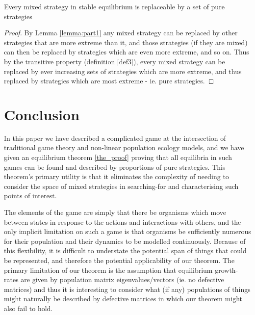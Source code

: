 \begin{Theorem}\label{the_proof}
Every mixed strategy in stable equilibrium is replaceable by a set of pure strategies 
\end{Theorem}
\begin{proof}
By Lemma \ref{lemma:part1} any mixed strategy can be replaced by other strategies that are more extreme than it, and those strategies (if they are mixed) can then be replaced by strategies which are even more extreme, and so on.
Thus by the transitive property (definition \ref{def3}), every mixed strategy can be replaced by ever increasing sets of strategies which are more extreme, and thus replaced by strategies which are most extreme - ie. pure strategies.
\end{proof}

\section{Conclusion}\label{sec:conclusion}

In this paper we have described a complicated game at the intersection of traditional game theory and non-linear population ecology models, and we have given an equilibrium theorem \ref{the_proof} proving that all equilibria in such games can be found and described by proportions of pure strategies. This theorem's primary utility is that it eliminates the complexity of needing to consider the space of mixed strategies in searching-for and characterising such points of interest.

The elements of the game are simply that there be organisms which move between states in response to the actions and interactions with others,
and the only implicit limitation on such a game is that organisms be sufficiently numerous for their population and their dynamics to be modelled continuously.
Because of this flexibility, it is difficult to understate the potential span of things that could be represented, and therefore the potential applicability of our theorem.
The primary limitation of our theorem is the assumption that equilibrium growth-rates are given by population matrix eigenvalues/vectors (ie. no defective matrices) and thus it is interesting to consider what (if any) populations of things might naturally be described by defective matrices in which our theorem might also fail to hold.



